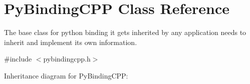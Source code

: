 \hypertarget{classPyBindingCPP}{}\section{Py\+Binding\+C\+PP Class Reference}
\label{classPyBindingCPP}


The base class for python binding it gets inherited by any application needs to inherit and implement its own information.  




{\ttfamily \#include $<$pybindingcpp.\+h$>$}



Inheritance diagram for Py\+Binding\+C\+PP\+:
